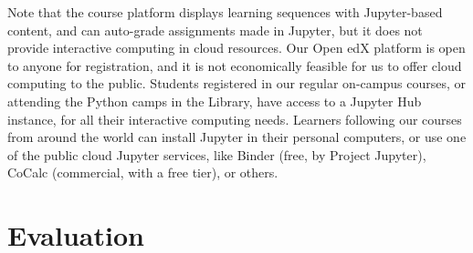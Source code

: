 \documentclass[10pt,journal,compsoc]{IEEEtran}
\begin{document}
\bigskip 

Note that the course platform displays learning sequences with Jupyter-based content, and can auto-grade assignments made in Jupyter, but it does not provide interactive computing in cloud resources. 
Our Open edX platform is open to anyone for registration, and it is not economically feasible for us to offer cloud computing to the public. 
Students registered in our regular on-campus courses, or attending the Python camps in the Library, have access to a Jupyter Hub instance, for all their interactive computing needs. 
Learners following our courses from around the world can install Jupyter in their personal computers, or use one of the public cloud Jupyter services, like Binder (free, by Project Jupyter), CoCalc (commercial, with a free tier), or others.

\section{Evaluation}
\end{document}
